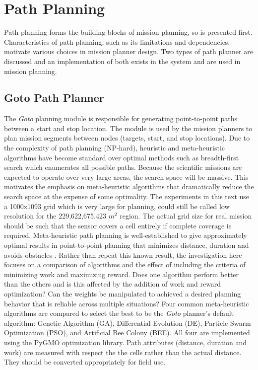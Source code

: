 \documentclass{tamuccthesis}
\begin{document}
\section{Path Planning}

Path planning forms the building blocks of mission planning, so is presented first. Characteristics of path planning, such as its limitations and dependencies, motivate various choices in mission planner design. Two types of path planner are discussed and an implementation of both exists in the system and are used in mission planning.

\subsection{Goto Path Planner} \label{section:goto}

The \textit{Goto} planning module is responsible for generating point-to-point paths between a start and stop location. The module is used by the mission planners to plan mission segments between nodes (targets, start, and stop locations). Due to the complexity of path planning (NP-hard), heuristic and meta-heuristic algorithms have become standard over optimal methods such as breadth-first search which enumerates all possible paths. Because the scientific missions are expected to operate over very large areas, the search space will be massive. This motivates the emphasis on meta-heuristic algorithms that dramatically reduce the search space at the expense of some optimality. The experiments in this text use a 1000x1093 grid which is very large for planning, could still be called low resolution for the 229,622,675.423 $m^2$ region. The actual grid size for real mission should be such that the sensor covers a cell entirely if complete coverage is required. Meta-heuristic path planning is well-established to give approximately optimal results in point-to-point planning that minimizes distance, duration and avoids obstacles \cite{hussein2012}. Rather than repeat this known result, the investigation here focuses on a comparison of algorithms and the effect of including the criteria of minimizing work and maximizing reward. Does one algorithm perform better than the others and is this affected by the addition of work and reward optimization? Can the weights be manipulated to achieved a desired planning behavior that is reliable across multiple situations? Four common meta-heuristic algorithms are compared to select the best to be the \textit{Goto} planner's default algorithm: Genetic Algorithm (GA), Differential Evolution (DE), Particle Swarm Optimization (PSO), and Artificial Bee Colony (BEE). All four are implemented using the PyGMO optimization library\cite{PyGMO}. Path attributes (distance, duration and work) are measured with respect the the cells rather than the actual distance. They should be converted appropriately for field use.
\end{document}
